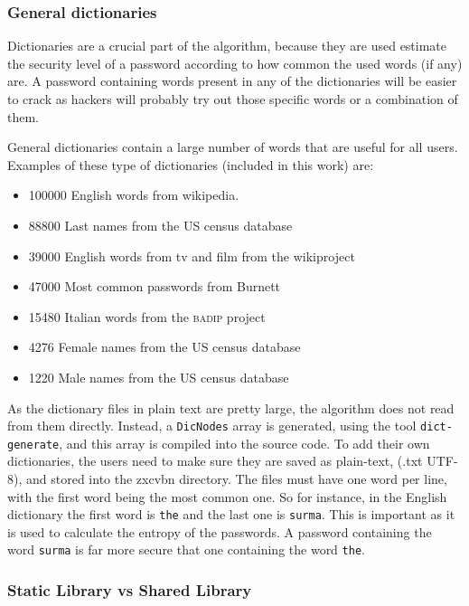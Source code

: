\subsubsection*{General dictionaries}

Dictionaries are a crucial part of the algorithm, because they are used estimate the security level of a password according to how common the used words (if any) are. A password containing words present in any of the dictionaries will be easier to crack as hackers will probably try out those specific words or a combination of them.

General dictionaries contain a large number of words that are useful for all users. Examples of these type of dictionaries (included in this work) are:
\begin{itemize}
\setlength\itemsep{-3pt}

\item 100000 English words from wikipedia.
\item 88800 Last names from the US census database
\item 39000 English words from tv and film from the wikiproject \cite{wiktionary}
\item 47000 Most common passwords from Burnett \cite{burnett}
\item 15480 Italian words from the \textsc{badip} project \cite{badip} 
\item 4276 Female names from the US census database 
\item 1220 Male names from the US census database
\end{itemize} 

As the dictionary files in plain text are pretty large, the algorithm does not read from them directly. Instead, a \texttt{DicNodes} array is generated, using the tool \texttt{dict-generate}, and this array is compiled into the source code.
To add their own dictionaries, the users need to make sure they are saved as plain-text, (.txt UTF-8), and stored into the zxcvbn directory. The files must have one word per line, with the first word being the most common one. So for instance, in the English dictionary the first word is \texttt{the} and the last one is \texttt{surma}. This is important as it is used to calculate the entropy of the passwords. A password containing the word \texttt{surma} is far more secure that one containing the word \texttt{the}.

\subsubsection*{Static Library vs Shared Library}

